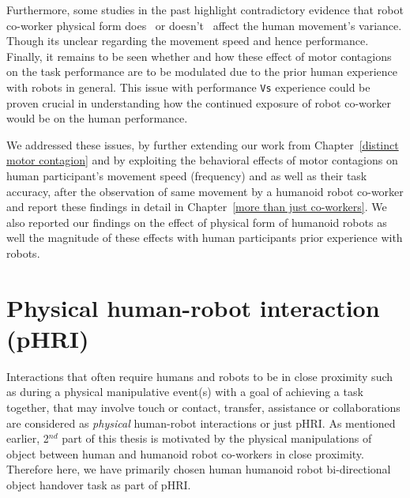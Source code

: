 Furthermore, some studies in the past highlight contradictory evidence that robot co-worker physical form does~\cite{Chaminade:JPP:2009} or doesn't~\cite{Kupferberg:PlosOne:2012} affect the human movement's variance. Though its unclear regarding the movement speed and hence performance. Finally, it remains to be seen whether and how these effect of motor contagions on the task performance are to be modulated due to the prior human experience with robots in general. This issue with performance \texttt{Vs} experience could be proven crucial in understanding how the continued exposure of robot co-worker would be on the human performance.

We addressed these issues, by further extending our work from Chapter~\ref{distinct motor contagion} and by exploiting the behavioral effects of motor contagions on human participant's movement speed (frequency) and as well as their task accuracy, after the observation of same movement by a humanoid robot co-worker and report these findings in detail in Chapter~\ref{more than just co-workers}. We also reported our findings on the effect of physical form of humanoid robots as well the magnitude of these effects with human participants prior experience with robots.



\clearpage

\section{Physical human-robot interaction (pHRI)}


Interactions that often require humans and robots to be in close proximity such as during a physical manipulative event(s) with a goal of achieving a task together, that may involve touch or contact, transfer, assistance or collaborations are considered as \textit{physical} human-robot interactions or just pHRI. As mentioned earlier, 2$^{nd}$ part of this thesis is motivated by the physical manipulations of object between human and humanoid robot co-workers in close proximity. Therefore here, we have primarily chosen human humanoid robot bi-directional object handover task as part of pHRI.  

